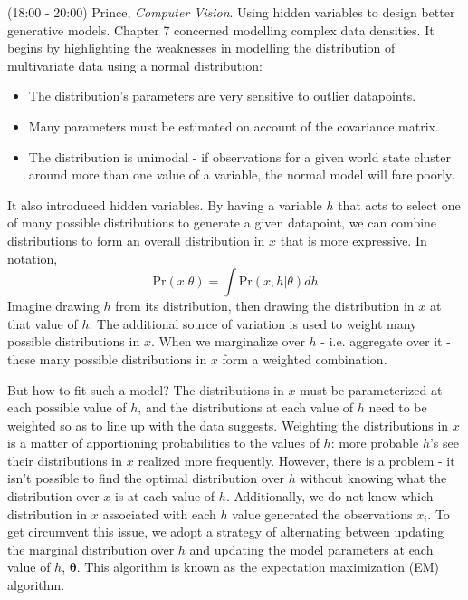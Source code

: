 \documentclass[idxtotoc,hyperref,openany]{labbook} %
\begin{document}
(18:00 - 20:00) Prince, \emph{Computer Vision}. Using hidden variables to design better generative models.
Chapter 7 concerned modelling complex data densities. It begins by highlighting the weaknesses in modelling the distribution of multivariate data using a normal distribution:
\begin{itemize}
	\item The distribution's parameters are very sensitive to outlier datapoints.
	\item Many parameters must be estimated on account of the covariance matrix.
	\item The distribution is unimodal - if observations for a given world state cluster around more than one value of a variable, the normal model will fare poorly.
\end{itemize}
It also introduced hidden variables. By having a variable $h$ that acts to select one of many possible distributions to generate a given datapoint, we can combine distributions to form an overall distribution in $x$ that is more expressive. In notation,
\[
	\text{Pr}(x|\theta) = \int \text{Pr}(x, h | \theta) dh
\]
Imagine drawing $h$ from its distribution, then drawing the distribution in $x$ at that value of $h$. The additional source of variation is used to weight many possible distributions in $x$. When we marginalize over $h$ - i.e. aggregate over it - these many possible distributions in $x$ form a weighted combination.

But how to fit such a model? The distributions in $x$ must be parameterized at each possible value of $h$, and the distributions at each value of $h$ need to be weighted so as to line up with the data suggests. Weighting the distributions in $x$ is a matter of apportioning probabilities to the values of $h$: more probable $h$'s see their distributions in $x$ realized more frequently. However, there is a problem - it isn't possible to find the optimal distribution over $h$ without knowing what the distribution over $x$ is at each value of $h$. Additionally, we do not know which distribution in $x$ associated with each $h$ value generated the observations $x_i$.  To get circumvent this issue, we adopt a strategy of alternating between updating the marginal distribution over $h$ and updating the model parameters at each value of $h$, $\mathbf{\theta}$. This algorithm is known as the expectation maximization (EM) algorithm.
\end{document}
